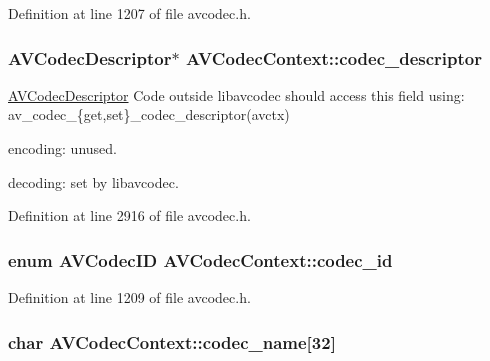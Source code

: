 Definition at line 1207 of file avcodec.\+h.

\subsubsection[{\texorpdfstring{codec\+\_\+descriptor}{codec_descriptor}}]{ {\bf A\+V\+Codec\+Descriptor}$\ast$ A\+V\+Codec\+Context\+::codec\+\_\+descriptor}\hypertarget{struct_a_v_codec_context_a0a67e07b5cc77bb9dabeba7fa4c41f78}{}\label{struct_a_v_codec_context_a0a67e07b5cc77bb9dabeba7fa4c41f78}
\hyperlink{struct_a_v_codec_descriptor}{A\+V\+Codec\+Descriptor} Code outside libavcodec should access this field using\+: av\+\_\+codec\+\_\+\{get,set\}\+\_\+codec\+\_\+descriptor(avctx)
\begin{DoxyItemize}
\item encoding\+: unused.
\item decoding\+: set by libavcodec. 
\end{DoxyItemize}

Definition at line 2916 of file avcodec.\+h.

\subsubsection[{\texorpdfstring{codec\+\_\+id}{codec_id}}]{\setlength{\rightskip}{0pt plus 5cm}enum {\bf A\+V\+Codec\+ID} A\+V\+Codec\+Context\+::codec\+\_\+id}\hypertarget{struct_a_v_codec_context_adc5f65d6099fd8339c1580c091777223}{}\label{struct_a_v_codec_context_adc5f65d6099fd8339c1580c091777223}


Definition at line 1209 of file avcodec.\+h.

\subsubsection[{\texorpdfstring{codec\+\_\+name}{codec_name}}]{\setlength{\rightskip}{0pt plus 5cm}char A\+V\+Codec\+Context\+::codec\+\_\+name\mbox{[}32\mbox{]}}\hypertarget{struct_a_v_codec_context_a8a85cb13e730b57b121e7aac3306ec87}{}\label{struct_a_v_codec_context_a8a85cb13e730b57b121e7aac3306ec87}


